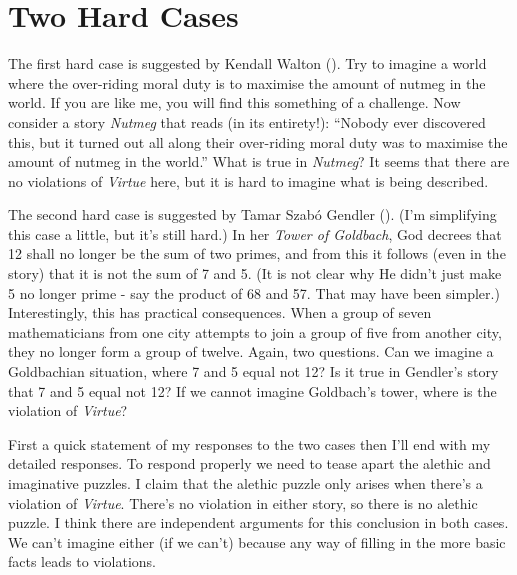 \documentclass[
  10pt,
  letterpaper,
  DIV=11,
  numbers=noendperiod,
  twoside]{scrartcl}
\begin{document}
\section{Two Hard Cases}\label{two-hard-cases}

The first hard case is suggested by Kendall Walton
(). Try to imagine a world where the
over-riding moral duty is to maximise the amount of nutmeg in the world.
If you are like me, you will find this something of a challenge. Now
consider a story \emph{Nutmeg} that reads (in its entirety!): ``Nobody
ever discovered this, but it turned out all along their over-riding
moral duty was to maximise the amount of nutmeg in the world.'' What is
true in \emph{Nutmeg}? It seems that there are no violations of
\emph{Virtue} here, but it is hard to imagine what is being described.

The second hard case is suggested by Tamar Szabó Gendler
(). (I'm simplifying this case a little,
but it's still hard.) In her \emph{Tower of Goldbach}, God decrees that
12 shall no longer be the sum of two primes, and from this it follows
(even in the story) that it is not the sum of 7 and 5. (It is not clear
why He didn't just make 5 no longer prime - say the product of 68 and
57. That may have been simpler.) Interestingly, this has practical
consequences. When a group of seven mathematicians from one city
attempts to join a group of five from another city, they no longer form
a group of twelve. Again, two questions. Can we imagine a Goldbachian
situation, where 7 and 5 equal not 12? Is it true in Gendler's story
that 7 and 5 equal not 12? If we cannot imagine Goldbach's tower, where
is the violation of \emph{Virtue}?

First a quick statement of my responses to the two cases then I'll end
with my detailed responses. To respond properly we need to tease apart
the alethic and imaginative puzzles. I claim that the alethic puzzle
only arises when there's a violation of \emph{Virtue}. There's no
violation in either story, so there is no alethic puzzle. I think there
are independent arguments for this conclusion in both cases. We can't
imagine either (if we can't) because any way of filling in the more
basic facts leads to violations.
\end{document}
